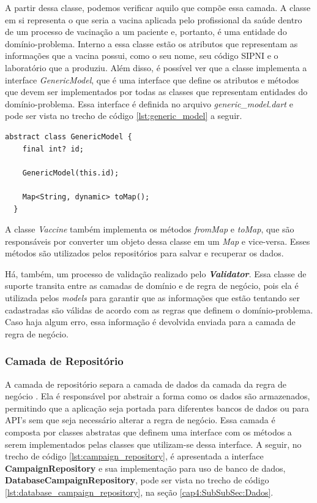 A partir dessa classe, podemos verificar aquilo que compõe essa camada. A classe em si representa o que seria a vacina aplicada pelo profissional da saúde dentro de um processo de vacinação a um paciente e, portanto, é uma entidade do domínio-problema. Interno a essa classe estão os atributos que representam as informações que a vacina possui, como o seu nome, seu código SIPNI e o laboratório que a produziu. Além disso, é possível ver que a classe implementa a interface \textit{GenericModel}, que é uma interface que define os atributos e métodos que devem ser implementados por todas as classes que representam entidades do domínio-problema. Essa interface é definida no arquivo \textit{generic\_model.dart} e pode ser vista no trecho de código \ref{lst:generic_model} a seguir.

\begin{lstlisting}[caption={Interface \textbf{GenericModel}}, label={lst:generic_model}]
  abstract class GenericModel {
    final int? id;
  
    GenericModel(this.id);
  
    Map<String, dynamic> toMap();
  }
\end{lstlisting}

A classe \textit{Vaccine} também implementa os métodos \textit{fromMap} e \textit{toMap}, que são responsáveis por converter um objeto dessa classe em um \textit{Map} e vice-versa. Esses métodos são utilizados pelos repositórios para salvar e recuperar os dados.

Há, também, um processo de validação realizado pelo \textbf{\textit{Validator}}. Essa classe de suporte transita entre as camadas de domínio e de regra de negócio, pois ela é utilizada pelos \textit{models} para garantir que as informações que estão tentando ser cadastradas são válidas de acordo com as regras que definem o domínio-problema. Caso haja algum erro, essa informação é devolvida enviada para a camada de regra de negócio.

\subsubsection{Camada de Repositório}
\label{cap4:SubSubSec:Repositorio}

A camada de repositório separa a camada de dados da camada da regra de negócio \cite{Faust2020} \cite{andrea_repositories}. Ela é responsável por abstrair a forma como os dados são armazenados, permitindo que a aplicação seja portada para diferentes bancos de dados ou para API's sem que seja necessário alterar a regra de negócio. Essa camada é composta por classes abstratas que definem uma interface com os métodos a serem implementados pelas classes que utilizam-se dessa interface. A seguir, no trecho de código \ref{lst:campaign_repository}, é apresentada a interface \textbf{CampaignRepository} e sua implementação para uso de banco de dados, \textbf{DatabaseCampaignRepository}, pode ser vista no trecho de código \ref{lst:database_campaign_repository}, na seção \ref{cap4:SubSubSec:Dados}.

